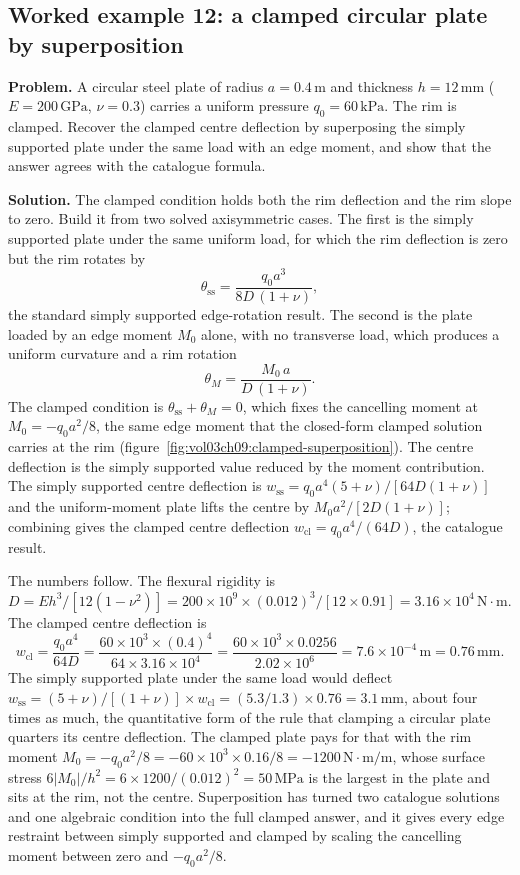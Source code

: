 \subsection*{Worked example 12: a clamped circular plate by superposition}



\textbf{Problem.} A circular steel plate of radius $a = 0.4\,\si{\meter}$
and thickness $h = 12\,\si{\milli\meter}$ ($E = 200\,\text{GPa}$,
$\nu = 0.3$) carries a uniform pressure $q_0 = 60\,\text{kPa}$. The rim
is clamped. Recover the clamped centre deflection by superposing the
simply supported plate under the same load with an edge moment, and show
that the answer agrees with the catalogue formula.

\textbf{Solution.} The clamped condition holds both the rim deflection
and the rim slope to zero. Build it from two solved axisymmetric cases.
The first is the simply supported plate under the same uniform load, for
which the rim deflection is zero but the rim rotates by
\[
\theta_{\text{ss}} = \frac{q_0 a^3}{8 D\,(1+\nu)},
\]
the standard simply supported edge-rotation result. The second is the
plate loaded by an edge moment $M_0$ alone, with no transverse load,
which produces a uniform curvature and a rim rotation
\[
\theta_{M} = \frac{M_0\, a}{D\,(1+\nu)}.
\]
The clamped condition is $\theta_{\text{ss}} + \theta_{M} = 0$, which
fixes the cancelling moment at $M_0 = -q_0 a^2/8$, the same edge moment
that the closed-form clamped solution carries at the rim
(figure~\ref{fig:vol03ch09:clamped-superposition}). The centre deflection
is the simply supported value reduced by the moment contribution. The
simply supported centre deflection is $w_{\text{ss}} = q_0 a^4 (5+\nu)/
[64 D (1+\nu)]$ and the uniform-moment plate lifts the centre by
$M_0 a^2/[2D(1+\nu)]$; combining gives the clamped centre deflection
$w_{\text{cl}} = q_0 a^4/(64 D)$, the catalogue result.

The numbers follow. The flexural rigidity is $D = E h^3/[12(1-\nu^2)] =
200\times 10^9 \times (0.012)^3/[12\times 0.91] = 3.16\times 10^4\,
\text{N}\cdot\text{m}$. The clamped centre deflection is
\[
w_{\text{cl}} = \frac{q_0 a^4}{64 D}
= \frac{60\times 10^3 \times (0.4)^4}{64\times 3.16\times 10^4}
= \frac{60\times 10^3 \times 0.0256}{2.02\times 10^6}
= 7.6\times 10^{-4}\,\text{m} = 0.76\,\si{\milli\meter}.
\]
The simply supported plate under the same load would deflect
$w_{\text{ss}} = (5+\nu)/[(1+\nu)] \times w_{\text{cl}} = (5.3/1.3)\times
0.76 = 3.1\,\si{\milli\meter}$, about four times as much, the
quantitative form of the rule that clamping a circular plate quarters
its centre deflection. The clamped plate pays for that with the rim
moment $M_0 = -q_0 a^2/8 = -60\times 10^3\times 0.16/8 = -1200\,\text{N}
\cdot\text{m}/\text{m}$, whose surface stress $6|M_0|/h^2 = 6\times 1200/
(0.012)^2 = 50\,\text{MPa}$ is the largest in the plate and sits at the
rim, not the centre. Superposition has turned two catalogue solutions and
one algebraic condition into the full clamped answer, and it gives every
edge restraint between simply supported and clamped by scaling the
cancelling moment between zero and $-q_0 a^2/8$.

